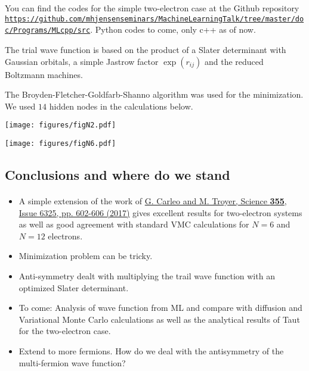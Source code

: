 \documentclass[aip,jcp,reprint,floatfix]{revtex4-1}
\begin{document}
\begin{itemize}
You can find the codes for the simple two-electron case at the Github repository \href{{https://github.com/mhjensenseminars/MachineLearningTalk/tree/master/doc/Programs/MLcpp/src}}{\nolinkurl{https://github.com/mhjensenseminars/MachineLearningTalk/tree/master/doc/Programs/MLcpp/src}}. Python codes to come, only c++ as of now. 

The trial wave function is based on the product of a Slater determinant with Gaussian orbitals, a simple Jastrow factor $\exp{(r_{ij})}$ and the reduced Boltzmann machines. 

The Broyden-Fletcher-Goldfarb-Shanno algorithm was used for the minimization. We used $14$ hidden nodes in the calculations below.

\centerline{\texttt{[image: figures/figN2.pdf]}}

\centerline{\texttt{[image: figures/figN6.pdf]}}


\subsection*{Conclusions and where do we stand}

\paragraph{}
\begin{itemize}
\item A simple extension of the work of \href{{http://science.sciencemag.org/content/355/6325/602}}{G. Carleo and M. Troyer, Science \textbf{355}, Issue 6325, pp. 602-606 (2017)} gives excellent results for two-electron systems as well as good agreement with standard VMC calculations for $N=6$ and $N=12$ electrons.

\item Minimization problem can be tricky.

\item Anti-symmetry dealt with multiplying the trail wave function with an optimized Slater determinant.

\item To come: Analysis of wave function from ML and compare with diffusion and Variational Monte Carlo calculations as well as the analytical results of Taut for the two-electron case.

\item Extend to more fermions. How do we deal with the antisymmetry of the multi-fermion wave function?
\begin{enumerate}


\end{enumerate}
\end{itemize}
\end{itemize}
\end{document}
